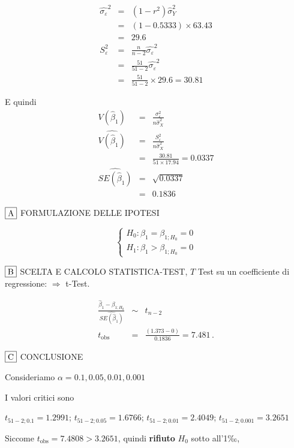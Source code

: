 \documentclass[
  11pt,
]{book}
\theoremstyle{mytheoremstyle}
\theoremstyle{mydefstyle}
\newenvironment{sol}
  {
  \begin{tcolorbox}[enhanced,breakable,arc=0.1mm,boxrule=1pt,colback=white,colframe=iblue,
  title=\bf \fontfamily{lmss}\selectfont \hspace{.5 cm} Soluzione,drop fuzzy shadow]

}{
\end{tcolorbox}
  }
\begin{document}
\begin{sol}
\begin{eqnarray*}
\hat{\sigma_\varepsilon}^2&=&(1-r^2)\hat\sigma_Y^2\\
&=& (1- 0.5333 )\times 63.43 \\
   &=&  29.6 \\
   S_\varepsilon^2 &=& \frac{n} {n-2} \hat{\sigma_\varepsilon}^2\\
   &=&  \frac{ 51 } { 51 -2} \hat{\sigma_\varepsilon}^2 \\
 &=&  \frac{ 51 } { 51 -2} \times  29.6  =  30.81  
\end{eqnarray*}

E quindi\begin{eqnarray*}
V(\hat\beta_{1}) &=& \frac{\sigma_{\varepsilon}^{2}} {n \hat{\sigma}^{2}_{X}} \\
\widehat{V(\hat\beta_{1})} &=& \frac{S_{\varepsilon}^{2}} {n \hat{\sigma}^{2}_{X}} \\
 &=& \frac{ 30.81 } { 51 \times  17.94 } =  0.0337 \\
 \widehat{SE(\hat\beta_{1})}        &=&  \sqrt{ 0.0337 }\\
 &=&  0.1836 
\end{eqnarray*}

\(\fbox{A}\) FORMULAZIONE DELLE IPOTESI

\[\begin{cases}
   H_0: \beta_1 = \beta_{1;H_0}=0 \\
   H_1: \beta_1 > \beta_{1;H_0}=0 
   \end{cases}\]

\(\fbox{B}\) SCELTA E CALCOLO STATISTICA-TEST, \(T\)
Test su un coefficiente di regressione: \(\Rightarrow\) t-Test.

\begin{eqnarray*}
 \frac{\hat\beta_{ 1 } - \beta_{ 1 ;H_0}} {\widehat{SE(\hat\beta_{ 1 })}}&\sim&t_{n-2}\\
   t_{\text{obs}}
&=& \frac{ ( 1.373 -  0 )} { 0.1836 }
 =   7.481 \, .
\end{eqnarray*}

\(\fbox{C}\) CONCLUSIONE

Consideriamo \(\alpha=0.1, 0.05, 0.01, 0.001\)

I valori critici sono

\(t_{51-2;0.1}=1.2991\); \(t_{51-2;0.05}=1.6766\); \(t_{51-2;0.01}=2.4049\); \(t_{51-2;0.001}=3.2651\)

Siccome \(t_\text{obs}=7.4808>3.2651\), quindi \textbf{rifiuto} \(H_0\) sotto all'1‰,


\end{sol}
\end{document}
